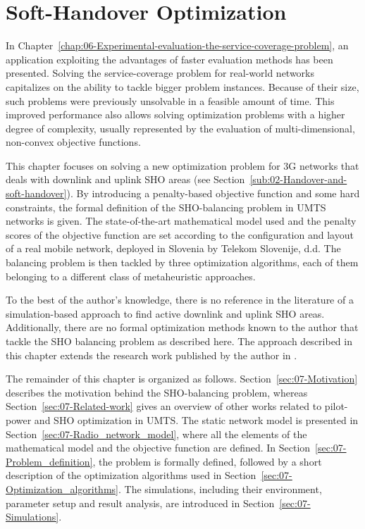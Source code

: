 
\chapter{Soft-Handover Optimization \label{chap:07-Experimental-evaluation-the-SHO-alignment-problem}}


\noindent In Chapter~\ref{chap:06-Experimental-evaluation-the-service-coverage-problem},
an application exploiting the advantages of faster evaluation methods
has been presented. Solving the service-coverage problem for real-world
networks capitalizes on the ability to tackle bigger problem instances.
Because of their size, such problems were previously unsolvable in
a feasible amount of time. This improved performance also allows solving
optimization problems with a higher degree of complexity, usually
represented by the evaluation of multi-dimensional, non-convex objective
functions.

\noindent This chapter focuses on solving a new optimization problem
for 3G networks that deals with downlink and uplink SHO areas (see
Section~\ref{sub:02-Handover-and-soft-handover}). By introducing
a penalty-based objective function and some hard constraints, the
formal definition of the SHO-balancing problem in UMTS networks is
given. The state-of-the-art mathematical model used and the penalty
scores of the objective function are set according to the configuration
and layout of a real mobile network, deployed in Slovenia by Telekom
Slovenije, d.d. The balancing problem is then tackled by three optimization
algorithms, each of them belonging to a different class of metaheuristic
approaches.

To the best of the author's knowledge, there is no reference in the
literature of a simulation-based approach to find active downlink
and uplink SHO areas. Additionally, there are no formal optimization
methods known to the author that tackle the SHO balancing problem
as described here. The approach described in this chapter extends
the research work published by the author in \cite{Benedicic_Balancing_downlink_uplink_soft_handover_areas_in_UMTS_networks:2012}.

The remainder of this chapter is organized as follows. Section~\ref{sec:07-Motivation}
describes the motivation behind the SHO-balancing problem, whereas
Section~\ref{sec:07-Related-work} gives an overview of other works
related to pilot-power and SHO optimization in UMTS. The static network
model is presented in Section~\ref{sec:07-Radio_network_model},
where all the elements of the mathematical model and the objective
function are defined. In Section~\ref{sec:07-Problem_definition},
the problem is formally defined, followed by a short description of
the optimization algorithms used in Section~\ref{sec:07-Optimization_algorithms}.
The simulations, including their environment, parameter setup and
result analysis, are introduced in Section~\ref{sec:07-Simulations}.


